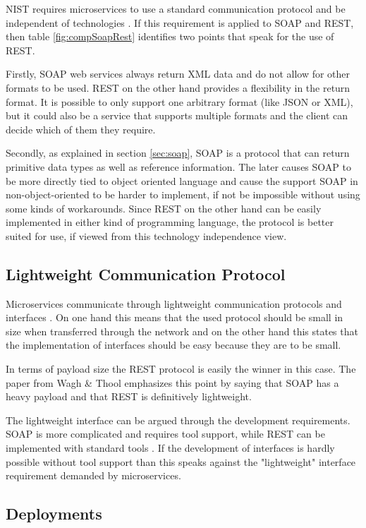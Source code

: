 \documentclass[conference]{IEEEtran}
\begin{document}
NIST requires microservices to use a standard communication protocol and be independent of technologies \cite{karmel2016nist}. If this requirement is applied to SOAP and REST, then table \ref{fig:compSoapRest} identifies two points that speak for the use of REST.

Firstly, SOAP web services always return XML data and do not allow for other formats to be used. REST on the other hand provides a flexibility in the return format. It is possible to only support one arbitrary format (like JSON or XML), but it could also be a service that supports multiple formats and the client can decide which of them they require.

Secondly, as explained in section \ref{sec:soap}, SOAP is a protocol that can return primitive data types as well as reference information. The later causes SOAP to be more directly tied to object oriented language and cause the support SOAP in non-object-oriented to be harder to implement, if not be impossible without using some kinds of workarounds. Since REST on the other hand can be easily implemented in either kind of programming language, the protocol is better suited for use, if viewed from this technology independence view.

\subsection{Lightweight Communication Protocol}

Microservices communicate through lightweight communication protocols and interfaces \cite{karmel2016nist}.
On one hand this means that the used protocol should be small in size when transferred through the network and on the other hand this states that the implementation of interfaces should be easy because they are to be small.

In terms of payload size the REST protocol is easily the winner in this case. The paper from Wagh \& Thool \cite{wagh2012comparative} emphasizes this point by saying that SOAP has a heavy payload and that REST is definitively lightweight.

The lightweight interface can be argued through the development requirements. SOAP is more complicated and requires tool support, while REST can be implemented with standard tools \cite{wagh2012comparative}. If the development of interfaces is hardly possible without tool support than this speaks against the "lightweight" interface requirement demanded by microservices.

\subsection{Deployments}
\end{document}
